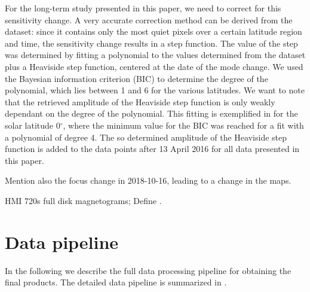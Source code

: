 \documentclass{aa}
\begin{document}
For the long-term study presented in this paper, we need to correct for this sensitivity change. A very accurate correction method can be derived from the \IN{} dataset: since it contains only the most quiet pixels over a certain latitude region and time, the sensitivity change results in a step function. The value of the step was determined by fitting a polynomial to the \brms{} values determined from the \IN{} dataset plus a Heaviside step function, centered at the date of the mode change. We used the Bayesian information criterion (BIC)\cite[]{Stoica2004}
to determine the degree of the polynomial, which lies between 1 and 6 for the various latitudes. We want to note that the retrieved amplitude of the Heaviside step function is only weakly dependant on the degree of the polynomial. This fitting is exemplified in  for the solar latitude 0$^\circ$, where the minimum value for the BIC was reached for a fit with a polynomial of degree 4. The so determined amplitude of the Heaviside step function is added to the data points after 13 April 2016 for all data presented in this paper.


Mention also the focus change in 2018-10-16, leading to a change in the \los{} maps. 

HMI 720s full disk magnetograms; 
Define \brms{}.

\section{Data pipeline}
In the following we describe the full data processing pipeline for obtaining the final products. The detailed data pipeline is summarized in .

%
\end{document}
